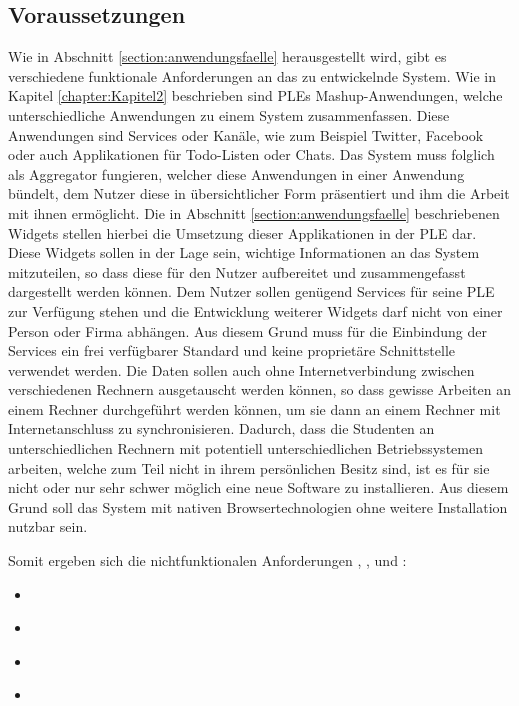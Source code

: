 \subsection{Voraussetzungen}
Wie in Abschnitt \ref{section:anwendungsfaelle} herausgestellt wird, gibt es verschiedene funktionale Anforderungen an das zu entwickelnde System. Wie in Kapitel \ref{chapter:Kapitel2} beschrieben sind \acp{PLE} Mashup-Anwendungen, welche unterschiedliche Anwendungen zu einem System zusammenfassen. Diese Anwendungen sind Services oder Kanäle, wie zum Beispiel Twitter, Facebook oder auch Applikationen für Todo-Listen oder Chats. Das System muss folglich als Aggregator fungieren, welcher diese Anwendungen in einer Anwendung bündelt, dem Nutzer diese in übersichtlicher Form präsentiert und ihm die Arbeit mit ihnen ermöglicht. Die in Abschnitt \ref{section:anwendungsfaelle} beschriebenen Widgets stellen hierbei die Umsetzung dieser Applikationen in der \ac{PLE} dar. Diese Widgets sollen in der Lage sein, wichtige Informationen an das System mitzuteilen, so dass diese für den Nutzer aufbereitet und zusammengefasst dargestellt werden können. Dem Nutzer sollen genügend Services für seine \ac{PLE} zur Verfügung stehen und die Entwicklung weiterer Widgets darf nicht von einer Person oder Firma abhängen. Aus diesem Grund muss für die Einbindung der Services ein frei verfügbarer Standard und keine proprietäre Schnittstelle verwendet werden. Die Daten sollen auch ohne Internetverbindung zwischen verschiedenen Rechnern ausgetauscht werden können, so dass gewisse Arbeiten an einem Rechner durchgeführt werden können, um sie dann an einem Rechner mit Internetanschluss zu synchronisieren. Dadurch, dass die Studenten an unterschiedlichen Rechnern mit potentiell unterschiedlichen Betriebssystemen arbeiten, welche zum Teil nicht in ihrem persönlichen Besitz sind, ist es für sie nicht oder nur sehr schwer möglich eine neue Software zu installieren. Aus diesem Grund soll das System mit nativen Browsertechnologien ohne weitere Installation nutzbar sein.

Somit ergeben sich die nichtfunktionalen Anforderungen , ,  und : 
\begin{itemize}
 \item \requirementnf{\requirementAggregator}\label{requirementAggregator}
 \item \requirementnf{\requirementWidgetStandard}\label{requirementWidgetStandard}
 \item \requirementnf{\requirementUsbStick}\label{requirementUsbStick}
 \item \requirementnf{\requirementUsageInBrowser}\label{requirementUsageInBrowser}
\end{itemize}

